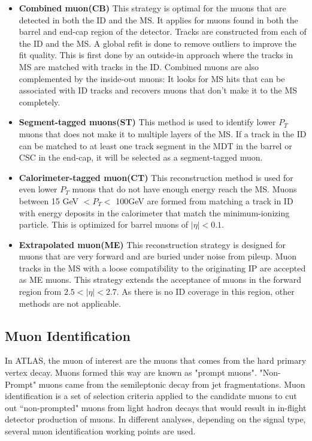 \begin{itemize}
\item \textbf{Combined muon(CB)}
    This strategy is optimal for the muons that are detected in both the ID and the MS. It applies for muons found in both the barrel and end-cap region of the detector. Tracks are constructed from each of the ID and the MS. A global refit is done to remove outliers to improve the fit quality. This is first done by an outside-in approach where the tracks in MS are matched with tracks in the ID. Combined muons are also complemented by the inside-out muons: It looks for MS hits that can be associated with ID tracks and recovers muons that don't make it to the MS completely.

\item \textbf{Segment-tagged muons(ST)}
This method is used to identify lower $P_{T}$ muons that does not make it to multiple layers of the MS. If a track in the ID can be matched to at least one track segment in the MDT in the barrel or CSC in the end-cap, it will be selected as a segment-tagged muon. 

\item \textbf{Calorimeter-tagged muon(CT)}
    This reconstruction method is used for even lower $P_{T}$ muons that do not have enough energy reach the MS. Muons between 15 GeV $< P_{T} < $ 100GeV are formed from matching a track in ID with energy deposits in the calorimeter that match the minimum-ionizing particle. This is optimized for barrel muons of $|\eta| <0.1$. 

\item \textbf{Extrapolated muon(ME)}
    This reconstruction strategy is designed for muons that are very forward and are buried under noise from pileup. Muon tracks in the MS with a loose compatibility to the originating IP are accepted as ME muons. This strategy extends the acceptance of muons in the forward region from $2.5<|\eta|<2.7$. As there is no ID coverage in this region, other methods are not applicable.
\end{itemize}

\subsection{Muon Identification}
In ATLAS, the muon of interest are the muons that comes from the hard primary vertex decay. Muons formed this way are known as "prompt muons". "Non-Prompt" muons came from the semileptonic decay from jet fragmentations. Muon identification is a set of selection criteria applied to the candidate muons to cut out ``non-prompted" muons from light hadron decays that would result in in-flight detector production of muons. In different analyses, depending on the signal type, several muon identification working points are used.

